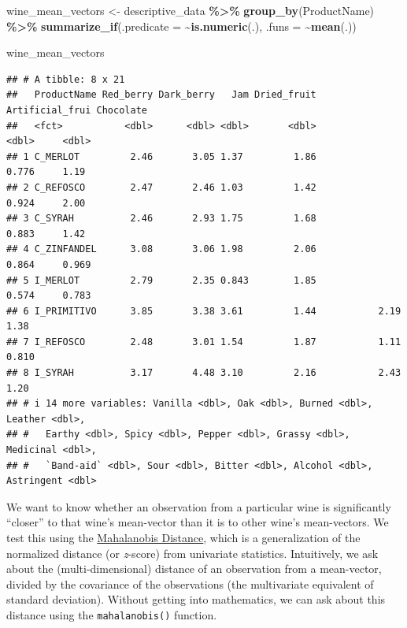 \documentclass[
]{book}
\newenvironment{Shaded}{\begin{snugshade}}{\end{snugshade}}
\newcommand{\AttributeTok}[1]{\textcolor[rgb]{0.13,0.29,0.53}{#1}}
\newcommand{\FunctionTok}[1]{\textcolor[rgb]{0.13,0.29,0.53}{\textbf{#1}}}
\newcommand{\NormalTok}[1]{#1}
\newcommand{\OtherTok}[1]{\textcolor[rgb]{0.56,0.35,0.01}{#1}}
\newcommand{\SpecialCharTok}[1]{\textcolor[rgb]{0.81,0.36,0.00}{\textbf{#1}}}
\begin{document}
\begin{Shaded}
\begin{Highlighting}[]
\NormalTok{wine\_mean\_vectors }\OtherTok{\textless{}{-}} 
\NormalTok{  descriptive\_data }\SpecialCharTok{\%\textgreater{}\%}
  \FunctionTok{group\_by}\NormalTok{(ProductName) }\SpecialCharTok{\%\textgreater{}\%}
  \FunctionTok{summarize\_if}\NormalTok{(}\AttributeTok{.predicate =} \SpecialCharTok{\textasciitilde{}}\FunctionTok{is.numeric}\NormalTok{(.),}
               \AttributeTok{.funs =} \SpecialCharTok{\textasciitilde{}}\FunctionTok{mean}\NormalTok{(.))}

\NormalTok{wine\_mean\_vectors}
\end{Highlighting}
\end{Shaded}

\begin{verbatim}
## # A tibble: 8 x 21
##   ProductName Red_berry Dark_berry   Jam Dried_fruit Artificial_frui Chocolate
##   <fct>           <dbl>      <dbl> <dbl>       <dbl>           <dbl>     <dbl>
## 1 C_MERLOT         2.46       3.05 1.37         1.86           0.776     1.19 
## 2 C_REFOSCO        2.47       2.46 1.03         1.42           0.924     2.00 
## 3 C_SYRAH          2.46       2.93 1.75         1.68           0.883     1.42 
## 4 C_ZINFANDEL      3.08       3.06 1.98         2.06           0.864     0.969
## 5 I_MERLOT         2.79       2.35 0.843        1.85           0.574     0.783
## 6 I_PRIMITIVO      3.85       3.38 3.61         1.44           2.19      1.38 
## 7 I_REFOSCO        2.48       3.01 1.54         1.87           1.11      0.810
## 8 I_SYRAH          3.17       4.48 3.10         2.16           2.43      1.20 
## # i 14 more variables: Vanilla <dbl>, Oak <dbl>, Burned <dbl>, Leather <dbl>,
## #   Earthy <dbl>, Spicy <dbl>, Pepper <dbl>, Grassy <dbl>, Medicinal <dbl>,
## #   `Band-aid` <dbl>, Sour <dbl>, Bitter <dbl>, Alcohol <dbl>, Astringent <dbl>
\end{verbatim}

We want to know whether an observation from a particular wine is significantly ``closer'' to that wine's mean-vector than it is to other wine's mean-vectors. We test this using the \href{https://en.wikipedia.org/wiki/Mahalanobis_distance}{Mahalanobis Distance}, which is a generalization of the normalized distance (or \emph{z}-score) from univariate statistics. Intuitively, we ask about the (multi-dimensional) distance of an observation from a mean-vector, divided by the covariance of the observations (the multivariate equivalent of standard deviation). Without getting into mathematics, we can ask about this distance using the \texttt{mahalanobis()} function.
\end{document}
